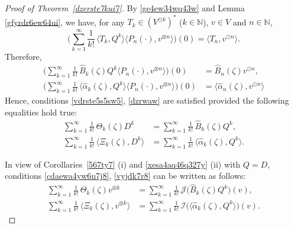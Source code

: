 \documentclass[10pt,a4paper]{amsart}
\begin{document}
\begin{proof}[Proof of Theorem~\ref{dzerste7kui7}]
By \eqref{ge4ew34wq43w} and Lemma \ref{gfyrdr6ew64ui}, we have, for any $T_k\in(V^{\odot k})^*$ ($k\in\mathbb N$), $v\in V$ and $n\in\mathbb N$,
\begin{equation*}
\bigg(\sum_{k=1}^\infty \frac 1{k!}\,\langle T_k, Q^{k}\rangle\langle P_n(\cdot),v^{\otimes n}\rangle\bigg)(0)=\langle T_n,v^{\odot n}\rangle.
\end{equation*}
Therefore,
\begin{align*}
\bigg(\sum_{k=1}^\infty \frac 1{k!}\,\widehat B_{k}(\zeta)Q^{k}\langle P_n(\cdot),v^{\otimes n}\rangle\bigg)(0)&=\widehat B_{n}(\zeta)v^{\odot n},\\
\bigg(\sum_{k=1}^\infty \frac 1{k!}\,\langle  \widehat\alpha_{k}(\zeta), Q^{k}\rangle\langle P_n(\cdot),v^{\otimes n}\rangle\bigg)(0)&=\langle  \widehat\alpha_{n}(\zeta),v^{\odot n}\rangle
\end{align*}
Hence, conditions \eqref{vdrste5s5sw5}, \eqref{dzrwaw} are satisfied provided the following equalities hold true:
\begin{align}
\sum_{k=1}^\infty \frac 1{k!}\,  \Theta_k(\zeta) D^{k} &=\sum_{k=1}^\infty \frac 1{k!}\,\widehat B_{k}(\zeta) Q^{k}\label{cdaewa4yw6u7j8},\\
\sum_{k=1}^\infty \frac 1{k!}\,  \langle \Xi_k(\zeta), D^{k}\rangle &=\sum_{k=1}^\infty \frac 1{k!}\,\langle \widehat \alpha_{k}(\zeta), Q^{k}\rangle.
\label{vyjdk7r8}\end{align}

In view of Corollaries~\ref{567ty7} (i) and \ref{xesa4aq46q327y} (ii) with $Q=D$, conditions \eqref{cdaewa4yw6u7j8}, \eqref{vyjdk7r8} can be written as follows:
\begin{align}
\sum_{k=1}^\infty \frac 1{k!}\,  \Theta_k(\zeta) v^{\otimes k}&=\sum_{k=1}^\infty \frac 1{k!}\,\mathcal J\big(\widehat B_{k}(\zeta) Q^{k}\big)(v),\label{vcyd6i5}\\
\sum_{k=1}^\infty \frac 1{k!}\, \langle \Xi_k(\zeta), v^{\otimes k}\rangle&=\sum_{k=1}^\infty \frac 1{k!}\,\mathcal I\big(\langle \widehat \alpha_{k}(\zeta), Q^{k}\rangle\big)(v).\label{dsthe}
\end{align}


\end{proof}
\end{document}
